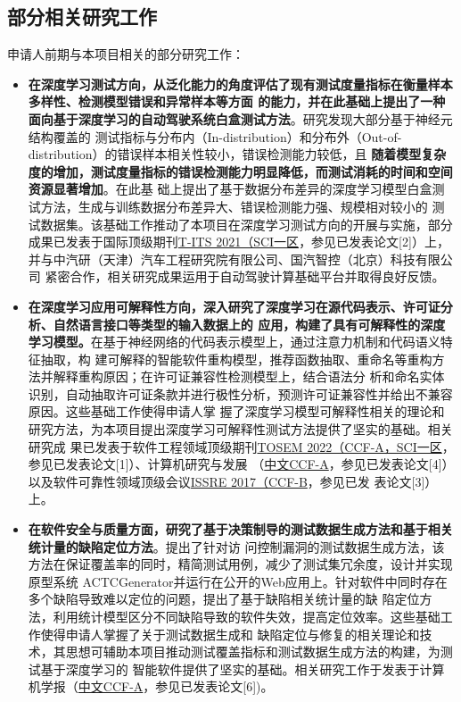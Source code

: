 \documentclass[a4paper,zihao=-4]{article}
\begin{document}
\subsection{部分相关研究工作}


申请人前期与本项目相关的部分研究工作：

\begin{itemize}
  \item \textbf{在深度学习测试方向，从泛化能力的角度评估了现有测试度量指标在衡量样本多样性、检测模型错误和异常样本等方面
          的能力，并在此基础上提出了一种面向基于深度学习的自动驾驶系统白盒测试方法}。研究发现大部分基于神经元结构覆盖的
        测试指标与分布内（In-distribution）和分布外（Out-of-distribution）的错误样本相关性较小，错误检测能力较低，且
        \textbf{随着模型复杂度的增加，测试度量指标的错误检测能力明显降低，而测试消耗的时间和空间资源显著增加}。在此基
        础上提出了基于数据分布差异的深度学习模型白盒测试方法，生成与训练数据分布差异大、错误检测能力强、规模相对较小的
        测试数据集。该基础工作推动了本项目在深度学习测试方向的开展与实施，部分成果已发表于国际顶级期刊\underline{T-ITS
          2021（SCI一区}，参见已发表论文[2]）上，并与中汽研（天津）汽车工程研究院有限公司、国汽智控（北京）科技有限公司
        紧密合作，相关研究成果运用于自动驾驶计算基础平台并取得良好反馈。

  \item \textbf{在深度学习应用可解释性方向，深入研究了深度学习在源代码表示、许可证分析、自然语言接口等类型的输入数据上的
          应用，构建了具有可解释性的深度学习模型。}在基于神经网络的代码表示模型上，通过注意力机制和代码语义特征抽取，构
        建可解释的智能软件重构模型，推荐函数抽取、重命名等重构方法并解释重构原因；在许可证兼容性检测模型上，结合语法分
        析和命名实体识别，自动抽取许可证条款并进行极性分析，预测许可证兼容性并给出不兼容原因。这些基础工作使得申请人掌
        握了深度学习模型可解释性相关的理论和研究方法，为本项目提出深度学习可解释性测试方法提供了坚实的基础。相关研究成
        果已发表于软件工程领域顶级期刊\underline{TOSEM 2022（CCF-A，SCI一区}，参见已发表论文[1]）、计算机研究与发展
        （\underline{中文CCF-A}，参见已发表论文[4]）以及软件可靠性领域顶级会议\underline{ISSRE 2017（CCF-B}，参见已发
        表论文[3]）上。

  \item \textbf{在软件安全与质量方面，研究了基于决策制导的测试数据生成方法和基于相关统计量的缺陷定位方法}。提出了针对访
        问控制漏洞的测试数据生成方法，该方法在保证覆盖率的同时，精简测试用例，减少了测试集冗余度，设计并实现原型系统
        ACTCGenerator并运行在公开的Web应用上。针对软件中同时存在多个缺陷导致难以定位的问题，提出了基于缺陷相关统计量的缺
        陷定位方法，利用统计模型区分不同缺陷导致的软件失效，提高定位效率。这些基础工作使得申请人掌握了关于测试数据生成和
        缺陷定位与修复的相关理论和技术，其思想可辅助本项目推动测试覆盖指标和测试数据生成方法的构建，为测试基于深度学习的
        智能软件提供了坚实的基础。相关研究工作于发表于计算机学报（\underline{中文CCF-A}，参见已发表论文[6])。
\end{itemize}
\end{document}
